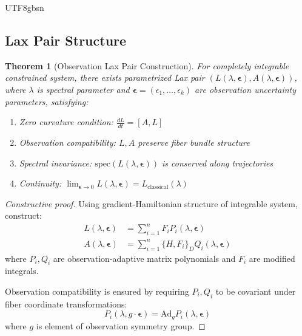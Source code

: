\documentclass[a4paper,12pt]{extarticle}
\newtheorem{theorem}{Theorem}
\theoremstyle{definition}
\begin{document}
\begin{CJK}{UTF8}{gbsn}
\subsection{Lax Pair Structure}

\begin{theorem}[Observation Lax Pair Construction]
For completely integrable constrained system, there exists parametrized Lax pair $(L(\lambda, \boldsymbol{\epsilon}), A(\lambda, \boldsymbol{\epsilon}))$, where $\lambda$ is spectral parameter and $\boldsymbol{\epsilon} = (\epsilon_1, \ldots, \epsilon_k)$ are observation uncertainty parameters, satisfying:
\begin{enumerate}[label=(\arabic*)]
\item Zero curvature condition: $\frac{dL}{dt} = [A, L]$
\item Observation compatibility: $L, A$ preserve fiber bundle structure
\item Spectral invariance: $\text{spec}(L(\lambda, \boldsymbol{\epsilon}))$ is conserved along trajectories
\item Continuity: $\lim_{\boldsymbol{\epsilon} \to 0} L(\lambda, \boldsymbol{\epsilon}) = L_{\text{classical}}(\lambda)$
\end{enumerate}
\end{theorem}

\begin{proof}[Constructive proof]
Using gradient-Hamiltonian structure of integrable system, construct:
\begin{align*}
L(\lambda, \boldsymbol{\epsilon}) &= \sum_{i=1}^n F_i P_i(\lambda, \boldsymbol{\epsilon}) \\
A(\lambda, \boldsymbol{\epsilon}) &= \sum_{i=1}^n \{H, F_i\}_D Q_i(\lambda, \boldsymbol{\epsilon})
\end{align*}
where $P_i, Q_i$ are observation-adaptive matrix polynomials and $F_i$ are modified integrals.

Observation compatibility is ensured by requiring $P_i, Q_i$ to be covariant under fiber coordinate transformations:
$$P_i(\lambda, g \cdot \boldsymbol{\epsilon}) = \text{Ad}_g P_i(\lambda, \boldsymbol{\epsilon})$$
where $g$ is element of observation symmetry group.
\end{proof}


\end{CJK}
\end{document}
